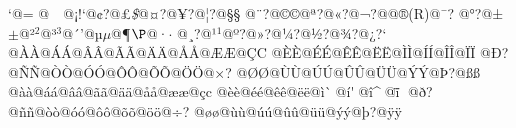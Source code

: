 {\newcount\acnt{}\catcode`@=\active{}
@^^a0{~}@^^a1{!`}@^^a2{?}@^^a3{{\it\$}}@^^a4{?}@^^a5{?}@^^a6{?}@^^a7{\S}%
@^^a8{?}@^^a9{\copyright}@^^aa{?}@^^ab{?}@^^ac{?}@^^ad{\-}@^^ae{(R)}@^^af{?}%
@^^b0{?}@^^b1{$\pm$}@^^b2{${}^2$}@^^b3{${}^3$}@^^b4{'}@^^b5{$\mu$}@^^b6{$\P$}@^^b7{$\cdot$}%
@^^b8{?}@^^b9{$^1$}@^^ba{?}@^^bb{?}@^^bc{?}@^^bd{?}@^^be{?}@^^bf{?`}%
@^^c0{\`A}@^^c1{\'A}@^^c2{\^A}@^^c3{\~A}@^^c4{\"A}@^^c5{\AA}@^^c6{\AE}@^^c7{\ptexc C}%
@^^c8{\`E}@^^c9{\'E}@^^ca{\^E}@^^cb{\"E}@^^cc{\`I}@^^cd{\'I}@^^ce{\^I}@^^cf{\"I}%
@^^d0{?}@^^d1{\~N}@^^d2{\`O}@^^d3{\'O}@^^d4{\^O}@^^d5{\~O}@^^d6{\"O}@^^d7{?}%
@^^d8{\O}@^^d9{\`U}@^^da{\'U}@^^db{\^U}@^^dc{\"U}@^^dd{\'Y}@^^de{?}@^^df{\ss}%
@^^e0{\`a}@^^e1{\'a}@^^e2{\^a}@^^e3{\~a}@^^e4{\"a}@^^e5{\aa}@^^e6{\ae}@^^e7{\ptexc c}%
@^^e8{\`e}@^^e9{\'e}@^^ea{\^e}@^^eb{\"e}@^^ec{\`^^P}@^^ed{\'^^P}@^^ee{\^{}^^P}@^^ef{\"^^P}%
@^^f0{?}@^^f1{\~n}@^^f2{\`o}@^^f3{\'o}@^^f4{\^o}@^^f5{\~o}@^^f6{\"o}@^^f7{?}%
@^^f8{\o}@^^f9{\`u}@^^fa{\'u}@^^fb{\^u}@^^fc{\"u}@^^fd{\'y}@^^fe{?}@^^ff{\"y}}%
